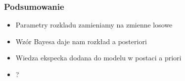 \documentclass{beamer}
\begin{document}
\begin{frame}
	\frametitle{Podsumowanie}
	\begin{itemize}
		\item Parametry rozkladu zamieniamy na zmienne losowe
		\item Wzór Bayesa daje nam rozkład a posteriori
		\item Wiedza ekspecka dodana do modelu w postaci a priori
		\item {\Large ?}
	\end{itemize}
\end{frame}
\end{document}
